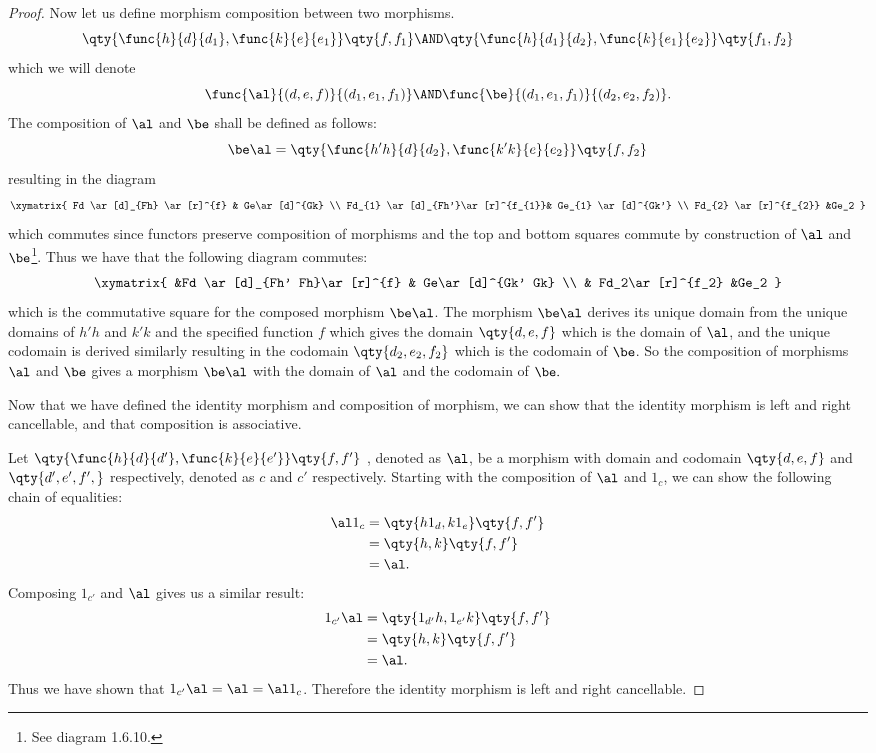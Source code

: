 \documentclass[../../main]{subfiles}
\begin{document}
\begin{proof}
	Now let us define morphism composition between two morphisms.
	$$\qty{\func{h}{d}{d_1},\func{k}{e}{e_1}} \qty{f,f_1} \AND
	\qty{\func{h}{d_1}{d_2},\func{k}{e_1}{e_2}} \qty{f_1,f_2}$$ which we will
	denote $$\func{\al}{(d,e,f)}{(d_1,e_1,f_1)} \AND
	\func{\be}{(d_1,e_1,f_1)}{(d_2,e_2,f_2)}.$$
	The composition of $\al$ and $\be$ shall be defined as follows:
	\[\be  \al=\qty{\func{h'  h}{d}{d_{2}},\func{k'  k}{e}{e_{2}}}\qty{f,f_2}\]
	resulting in the diagram
	\[\xymatrix{ Fd \ar[d]_{Fh} \ar[r]^{f} & Ge\ar[d]^{Gk}  \\
			Fd_{1} \ar[d]_{Fh'}\ar[r]^{f_{1}}& Ge_{1} \ar[d]^{Gk'} \\
	Fd_{2} \ar[r]^{f_{2}} &Ge_2 } \]
	which commutes since functors preserve composition of morphisms and the top
	and bottom squares commute by construction of $\al$ and $\be$\footnote{See diagram 1.6.10.}. Thus we have
	that the following diagram commutes:
	\[\xymatrix{ &Fd \ar[d]_{Fh'  Fh}\ar[r]^{f} & Ge\ar[d]^{Gk' Gk}
			 \\  & Fd_2\ar[r]^{f_2} &Ge_2 }\]
	which is the commutative square for the composed morphism $\be  \al$.
	The morphism $\be \al$ derives its unique domain from the unique
	domains of $h' h$ and $k' k$ and the specified function $f$
	which gives the domain $\qty{d,e,f}$ which is the domain of $\al$, and the
	unique codomain is derived similarly resulting in the codomain
	$\qty{d_2,e_2,f_2}$ which is the codomain of $\be$. So the composition of
	morphisms $\al$ and $\be$ gives a morphism $\be \al$ with the domain
	of $\al$ and the codomain of $\be.$

	Now that we have defined the identity morphism and composition of morphism,
	we can show that the identity morphism is left and right cancellable, and
	that composition is associative.

	Let $\qty{\func{h}{d}{d'},\func{k}{e}{e'}} \qty{f,f'}$ , denoted as $\al$,
	be a morphism with domain and codomain $\qty{d,e,f}$ and $\qty{d',e',f',}$
	respectively, denoted as $c$ and $c'$ respectively. Starting with the
	composition of $\al$ and $1_{c}$, we can show the following chain of
	equalities:
	\begin{align*}
	\al  1_{c } &= \qty{h 1_{d},k 1_{e}}\qty{f,f'}\\
	&= \qty{h,k}\qty{f,f'} \\
	 &= \al.
	\end{align*}
	Composing  $1_{c'}$ and $\al$ gives us a similar result:
	\begin{align*}
	1_{c' } \al &= \qty{1_{d'} h, 1_{e'} k}\qty{f,f'}\\
	&= \qty{h,k}\qty{f,f'}\\
	&= \al.
	\end{align*}
	Thus we have shown
	that $1_{c' } \al = \al = \al 1_{c}$. Therefore the identity
	morphism is left and right cancellable.


\end{proof}
\end{document}
